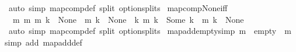 \begin{isabellebody}
%
\isatagproof
{}\isamarkupfalse%
\ {\isacharparenleft}{\kern0pt}auto\ simp{\isacharcolon}{\kern0pt}\ map{\isacharunderscore}{\kern0pt}comp{\isacharunderscore}{\kern0pt}def\ split{\isacharcolon}{\kern0pt}\ option{\isachardot}{\kern0pt}splits{\isacharparenright}{\kern0pt}%
\endisatagproof
{\isafoldproof}%
%
\isadelimproof
\isanewline
%
\endisadelimproof
\isanewline
{}\isamarkupfalse%
\ map{\isacharunderscore}{\kern0pt}comp{\isacharunderscore}{\kern0pt}None{\isacharunderscore}{\kern0pt}iff{\isacharcolon}{\kern0pt}\isanewline
\ \ {\isachardoublequoteopen}{\isacharparenleft}{\kern0pt}{\isacharparenleft}{\kern0pt}m{}\ {\isasymcirc}\isactrlsub m\ m{}{\isacharparenright}{\kern0pt}\ k\ {\isacharequal}{\kern0pt}\ None{\isacharparenright}{\kern0pt}\ {\isacharequal}{\kern0pt}\ {\isacharparenleft}{\kern0pt}m{}\ k\ {\isacharequal}{\kern0pt}\ None\ {\isasymor}\ {\isacharparenleft}{\kern0pt}{\isasymexists}k{\isacharprime}{\kern0pt}{\isachardot}{\kern0pt}\ m{}\ k\ {\isacharequal}{\kern0pt}\ Some\ k{\isacharprime}{\kern0pt}\ {\isasymand}\ m{}\ k{\isacharprime}{\kern0pt}\ {\isacharequal}{\kern0pt}\ None{\isacharparenright}{\kern0pt}{\isacharparenright}{\kern0pt}\ {\isachardoublequoteclose}\isanewline
%
\isadelimproof
%
\endisadelimproof
%
\isatagproof
{}\isamarkupfalse%
\ {\isacharparenleft}{\kern0pt}auto\ simp{\isacharcolon}{\kern0pt}\ map{\isacharunderscore}{\kern0pt}comp{\isacharunderscore}{\kern0pt}def\ split{\isacharcolon}{\kern0pt}\ option{\isachardot}{\kern0pt}splits{\isacharparenright}{\kern0pt}%
\endisatagproof
{\isafoldproof}%
%
\isadelimproof
%
\endisadelimproof
%
\isadelimdocument
%
\endisadelimdocument
%
\isatagdocument
%
\isamarkupsubsection{\isa{{\isacharplus}{\kern0pt}{\isacharplus}{\kern0pt}}%
}
\isamarkuptrue%
%
\endisatagdocument
{\isafolddocument}%
%
\isadelimdocument
%
\endisadelimdocument
{}\isamarkupfalse%
\ map{\isacharunderscore}{\kern0pt}add{\isacharunderscore}{\kern0pt}empty{\isacharbrackleft}{\kern0pt}simp{\isacharbrackright}{\kern0pt}{\isacharcolon}{\kern0pt}\ {\isachardoublequoteopen}m\ {\isacharplus}{\kern0pt}{\isacharplus}{\kern0pt}\ empty\ {\isacharequal}{\kern0pt}\ m{\isachardoublequoteclose}\isanewline
%
\isadelimproof
%
\endisadelimproof
%
\isatagproof
{}\isamarkupfalse%
{\isacharparenleft}{\kern0pt}simp\ add{\isacharcolon}{\kern0pt}\ map{\isacharunderscore}{\kern0pt}add{\isacharunderscore}{\kern0pt}def{\isacharparenright}{\kern0pt}%
\endisatagproof
{\isafoldproof}%
%
\isadelimproof
\isanewline
%
\endisadelimproof

\end{isabellebody}

